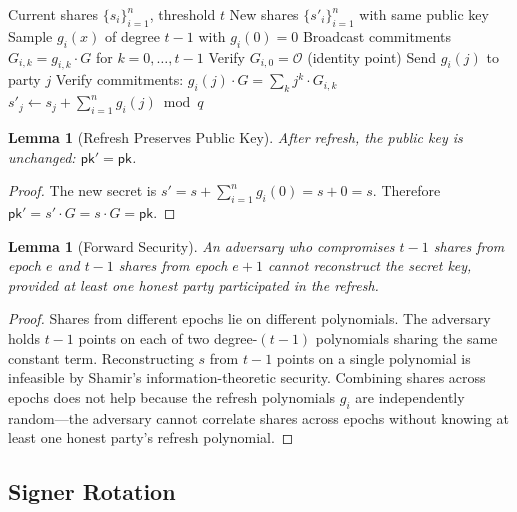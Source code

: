 \documentclass[11pt,twocolumn]{article}
\newtheorem{lemma}[theorem]{Lemma}
\begin{document}
\begin{algorithm}[H]
\caption{Proactive Key Refresh}
\label{alg:refresh}
\begin{algorithmic}[1]
\Require Current shares $\{s_i\}_{i=1}^n$, threshold $t$
\Ensure New shares $\{s'_i\}_{i=1}^n$ with same public key
  \State Sample $g_i(x)$ of degree $t-1$ with $g_i(0) = 0$
  \State Broadcast commitments $G_{i,k} = g_{i,k} \cdot G$ for $k = 0, \ldots, t-1$
  \State Verify $G_{i,0} = \mathcal{O}$ (identity point) 
  \State Send $g_i(j)$ to party $j$
\EndFor
{}
  \State Verify commitments: $g_i(j) \cdot G = \sum_k j^k \cdot G_{i,k}$
  \State $s'_j \gets s_j + \sum_{i=1}^n g_i(j) \bmod q$
\EndFor
\end{algorithmic}
\end{algorithm}

\begin{lemma}[Refresh Preserves Public Key]
\label{lem:refresh-pk}
After refresh, the public key is unchanged: $\mathsf{pk}' = \mathsf{pk}$.
\end{lemma}

\begin{proof}
The new secret is $s' = s + \sum_{i=1}^n g_i(0) = s + 0 = s$. Therefore
$\mathsf{pk}' = s' \cdot G = s \cdot G = \mathsf{pk}$.
\end{proof}

\begin{lemma}[Forward Security]
\label{lem:forward-sec}
An adversary who compromises $t-1$ shares from epoch $e$ and $t-1$ shares from
epoch $e+1$ cannot reconstruct the secret key, provided at least one honest party
participated in the refresh.
\end{lemma}

\begin{proof}
Shares from different epochs lie on different polynomials. The adversary holds
$t-1$ points on each of two degree-$(t-1)$ polynomials sharing the same constant
term. Reconstructing $s$ from $t-1$ points on a single polynomial is infeasible
by Shamir's information-theoretic security. Combining shares across epochs does not
help because the refresh polynomials $g_i$ are independently random---the adversary
cannot correlate shares across epochs without knowing at least one honest party's
refresh polynomial.
\end{proof}

\subsection{Signer Rotation}
\label{sec:rotation}
\end{document}

